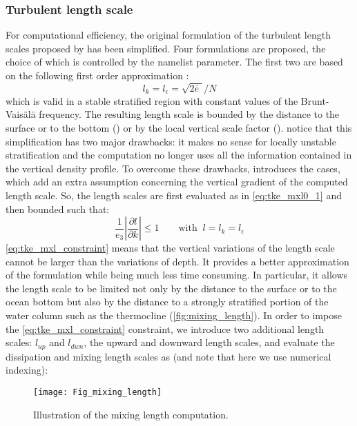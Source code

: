 \documentclass[../tex_main/NEMO_manual]{subfiles}
\begin{document}
\subsubsection{Turbulent length scale}
For computational efficiency, the original formulation of the turbulent length 
scales proposed by \citet{Gaspar1990} has been simplified. Four formulations 
are proposed, the choice of which is controlled by the  namelist 
parameter. The first two are based on the following first order approximation 
\citep{Blanke1993}:
\begin{equation} \label{eq:tke_mxl0_1}
l_k = l_\epsilon = \sqrt {2 \bar{e}\; } / N
\end{equation}
which is valid in a stable stratified region with constant values of the Brunt-
Vais\"{a}l\"{a} frequency. The resulting length scale is bounded by the distance 
to the surface or to the bottom () or by the local vertical scale factor 
(). \citet{Blanke1993} notice that this simplification has two major 
drawbacks: it makes no sense for locally unstable stratification and the 
computation no longer uses all the information contained in the vertical density 
profile. To overcome these drawbacks, \citet{Madec1998} introduces the 
 cases, which add an extra assumption concerning the vertical 
gradient of the computed length scale. So, the length scales are first evaluated 
as in \autoref{eq:tke_mxl0_1} and then bounded such that:
\begin{equation} \label{eq:tke_mxl_constraint}
\frac{1}{e_3 }\left| {\frac{\partial l}{\partial k}} \right| \leq 1
\qquad \text{with }\  l =  l_k = l_\epsilon
\end{equation}
\autoref{eq:tke_mxl_constraint} means that the vertical variations of the length 
scale cannot be larger than the variations of depth. It provides a better 
approximation of the \citet{Gaspar1990} formulation while being much less 
time consuming. In particular, it allows the length scale to be limited not only 
by the distance to the surface or to the ocean bottom but also by the distance 
to a strongly stratified portion of the water column such as the thermocline 
(\autoref{fig:mixing_length}). In order to impose the \autoref{eq:tke_mxl_constraint} 
constraint, we introduce two additional length scales: $l_{up}$ and $l_{dwn}$, 
the upward and downward length scales, and evaluate the dissipation and 
mixing length scales as (and note that here we use numerical indexing):
\begin{figure}[!t] \begin{center}
\texttt{[image: Fig\_mixing\_length]}
\caption{ \protect\label{fig:mixing_length} 
Illustration of the mixing length computation. }
\end{center}  
\end{figure}
\end{document}
